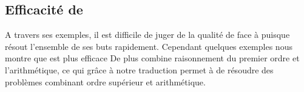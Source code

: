 
\subsection{Efficacité de \beagle}
A travers ses exemples, il est difficile de juger de la qualité de \beagle
face à \metis puisque \metis résout l'ensemble de ses buts 
rapidement.
Cependant quelques exemples nous montre que \beagle est plus efficace 
De plus \beagle combine raisonnement du premier ordre et l'arithmétique, ce qui grâce à notre traduction permet à \beagletac de résoudre des problèmes combinant ordre supérieur et arithmétique.

